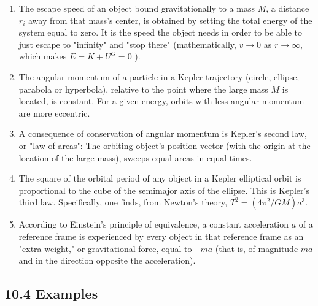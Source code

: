 \documentclass[10pt]{article}
\begin{document}
\begin{enumerate}
  \item The escape speed of an object bound gravitationally to a mass $M$, a distance $r_{i}$ away from that mass's center, is obtained by setting the total energy of the system equal to zero. It is the speed the object needs in order to be able to just escape to "infinity" and "stop there" (mathematically, $v \rightarrow 0$ as $r \rightarrow \infty$, which makes $E=K+U^{G}=0$ ).
  \item The angular momentum of a particle in a Kepler trajectory (circle, ellipse, parabola or hyperbola), relative to the point where the large mass $M$ is located, is constant. For a given energy, orbits with less angular momentum are more eccentric.
  \item A consequence of conservation of angular momentum is Kepler's second law, or "law of areas": The orbiting object's position vector (with the origin at the location of the large mass), sweeps equal areas in equal times.
  \item The square of the orbital period of any object in a Kepler elliptical orbit is proportional to the cube of the semimajor axis of the ellipse. This is Kepler's third law. Specifically, one finds, from Newton's theory, $T^{2}=\left(4 \pi^{2} / G M\right) a^{3}$.
  \item According to Einstein's principle of equivalence, a constant acceleration $a$ of a reference frame is experienced by every object in that reference frame as an "extra weight," or gravitational force, equal to - $m a$ (that is, of magnitude $m a$ and in the direction opposite the acceleration).
\end{enumerate}

\subsection*{10.4 Examples}
\end{document}
